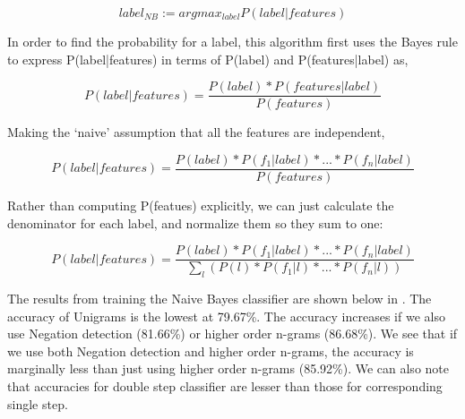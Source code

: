 \begin{equation}
label_{NB} := argmax_{label} P(label|features)
\end{equation}

In order to find the probability for a label, this algorithm first uses the
Bayes rule to express P(label|features) in terms of P(label) and
P(features|label) as,

\begin{equation}
P(label|features)
	= \frac	{P(label) * P(features|label)}
			{P(features)}
\end{equation}


Making the `naive' assumption that all the features are independent,

\begin{equation}
P(label|features)
	= \frac	{P(label) * P(f_1|label) * ... * P(f_n|label)}
			{P(features)}
\end{equation}


Rather than computing P(featues) explicitly, we can just calculate the
denominator for each label, and normalize them so they sum to one:

\begin{equation}
P(label|features)
	= \frac	{P(label) * P(f_1|label) * ... * P(f_n|label)}
			{\sum_l( P(l) * P(f_1|l) * ... * P(f_n|l) )}
\end{equation}


The results from training the Naive Bayes classifier are shown below in
. The accuracy of Unigrams is the lowest at 79.67\%. The
accuracy increases if we also use Negation detection (81.66\%) or higher order
n-grams (86.68\%). We see that if we use both Negation detection and higher
order n-grams, the accuracy is marginally less than just using higher order
n-grams (85.92\%). We can also note that accuracies for double step classifier
are lesser than those for corresponding single step.


